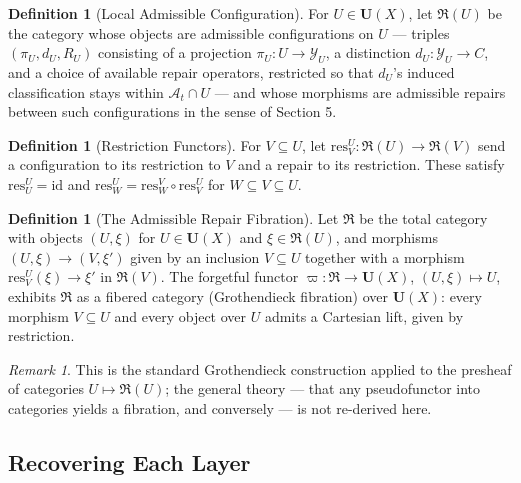 \documentclass[11pt]{article}
\theoremstyle{plain}
\theoremstyle{definition}
\newtheorem{definition}[theorem]{Definition}
\theoremstyle{remark}
\newtheorem{remark}[theorem]{Remark}
\begin{document}
\begin{definition}[Local Admissible Configuration]
For $U \in \mathbf{U}(X)$, let $\mathfrak{R}(U)$ be the category whose objects are admissible configurations on $U$ --- triples $(\pi_U, d_U, R_U)$ consisting of a projection $\pi_U : U \to \mathcal{Y}_U$, a distinction $d_U : \mathcal{Y}_U \to C$, and a choice of available repair operators, restricted so that $d_U$'s induced classification stays within $\mathcal{A}_t \cap U$ --- and whose morphisms are admissible repairs between such configurations in the sense of Section 5.
\end{definition}

\begin{definition}[Restriction Functors]
For $V \subseteq U$, let $\mathrm{res}^U_V : \mathfrak{R}(U) \to \mathfrak{R}(V)$ send a configuration to its restriction to $V$ and a repair to its restriction. These satisfy $\mathrm{res}^U_U = \mathrm{id}$ and $\mathrm{res}^U_W = \mathrm{res}^V_W \circ \mathrm{res}^U_V$ for $W \subseteq V \subseteq U$.
\end{definition}

\begin{definition}[The Admissible Repair Fibration]
Let $\mathfrak{R}$ be the total category with objects $(U,\xi)$ for $U \in \mathbf{U}(X)$ and $\xi \in \mathfrak{R}(U)$, and morphisms $(U,\xi) \to (V,\xi')$ given by an inclusion $V \subseteq U$ together with a morphism $\mathrm{res}^U_V(\xi) \to \xi'$ in $\mathfrak{R}(V)$. The forgetful functor $\varpi : \mathfrak{R} \to \mathbf{U}(X)$, $(U,\xi) \mapsto U$, exhibits $\mathfrak{R}$ as a fibered category (Grothendieck fibration) over $\mathbf{U}(X)$: every morphism $V \subseteq U$ and every object over $U$ admits a Cartesian lift, given by restriction.
\end{definition}

\begin{remark}
This is the standard Grothendieck construction applied to the presheaf of categories $U \mapsto \mathfrak{R}(U)$; the general theory --- that any pseudofunctor into categories yields a fibration, and conversely --- is not re-derived here.
\end{remark}

\subsection{Recovering Each Layer}
\end{document}
